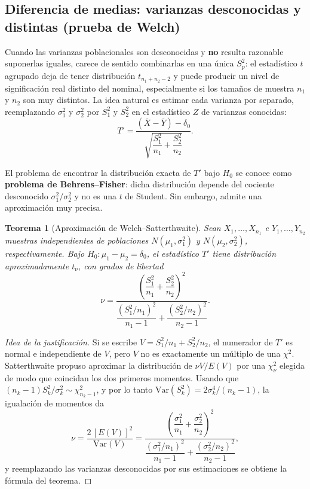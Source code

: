 \documentclass[11pt,a4paper]{article}
\theoremstyle{plain}
\newtheorem{teorema}{Teorema}[section]
\theoremstyle{definition}
\theoremstyle{remark}
\begin{document}
\subsection{Diferencia de medias: varianzas desconocidas y distintas (prueba de Welch)}

Cuando las varianzas poblacionales son desconocidas y \textbf{no} resulta razonable suponerlas iguales, carece de sentido combinarlas en una única $S_p^2$: el estadístico $t$ agrupado deja de tener distribución $t_{n_1+n_2-2}$ y puede producir un nivel de significación real distinto del nominal, especialmente si los tamaños de muestra $n_1$ y $n_2$ son muy distintos. La idea natural es estimar cada varianza por separado, reemplazando $\sigma_1^2$ y $\sigma_2^2$ por $S_1^2$ y $S_2^2$ en el estadístico $Z$ de varianzas conocidas:
\[
T'=\frac{(\overline X-\overline Y)-\delta_0}{\sqrt{\dfrac{S_1^2}{n_1}+\dfrac{S_2^2}{n_2}}}.
\]

El problema de encontrar la distribución exacta de $T'$ bajo $H_0$ se conoce como \textbf{problema de Behrens--Fisher}: dicha distribución depende del cociente desconocido $\sigma_1^2/\sigma_2^2$ y no es una $t$ de Student. Sin embargo, admite una aproximación muy precisa.

\begin{teorema}[Aproximación de Welch--Satterthwaite]
Sean $X_1,\dots,X_{n_1}$ e $Y_1,\dots,Y_{n_2}$ muestras independientes de poblaciones $N(\mu_1,\sigma_1^2)$ y $N(\mu_2,\sigma_2^2)$, respectivamente. Bajo $H_0:\mu_1-\mu_2=\delta_0$, el estadístico $T'$ tiene distribución aproximadamente $t_\nu$, con grados de libertad
\[
\nu=\frac{\left(\dfrac{S_1^2}{n_1}+\dfrac{S_2^2}{n_2}\right)^{2}}{\dfrac{(S_1^2/n_1)^2}{n_1-1}+\dfrac{(S_2^2/n_2)^2}{n_2-1}}.
\]
\end{teorema}

\begin{proof}[Idea de la justificación]
Si se escribe $V=S_1^2/n_1+S_2^2/n_2$, el numerador de $T'$ es normal e independiente de $V$, pero $V$ no es exactamente un múltiplo de una $\chi^2$. Satterthwaite propuso aproximar la distribución de $\nu V/E(V)$ por una $\chi^2_\nu$ elegida de modo que coincidan los dos primeros momentos. Usando que $(n_k-1)S_k^2/\sigma_k^2\sim\chi^2_{n_k-1}$, y por lo tanto $\text{Var}(S_k^2)=2\sigma_k^4/(n_k-1)$, la igualación de momentos da
\[
\nu=\frac{2\,[E(V)]^2}{\text{Var}(V)}=\frac{\left(\dfrac{\sigma_1^2}{n_1}+\dfrac{\sigma_2^2}{n_2}\right)^{2}}{\dfrac{(\sigma_1^2/n_1)^2}{n_1-1}+\dfrac{(\sigma_2^2/n_2)^2}{n_2-1}},
\]
y reemplazando las varianzas desconocidas por sus estimaciones se obtiene la fórmula del teorema.
\end{proof}
\end{document}
